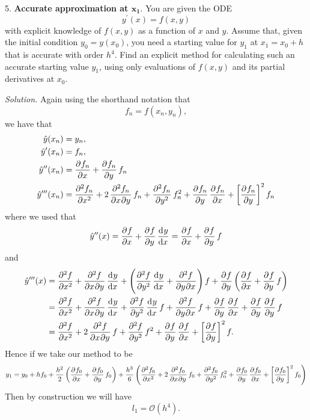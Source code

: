 \documentclass{article}
\newcommand{\Oh}{\mathcal{O}}
\begin{document}
\newpage

5. \textbf{Accurate approximation at $\boldsymbol{x_1}$}.
You are given the ODE
%
\begin{equation*}
    y^\prime(x) = f(x, y)
\end{equation*}
%
with explicit knowledge of $f(x, y)$ as a function of $x$ and $y$. Assume that, given the initial condition $y_0 = y(x_0)$,
you need a starting value for $y_1$ at $x_1 = x_0 + h$ that is accurate with order $h^4$. Find an explicit method for calculating
such an accurate starting value $y_1$, using only evaluations of $f(x, y)$ and its partial derivatives at $x_0$.

\textit{Solution.}
Again using the shorthand notation that
%
\begin{equation*}
    f_n = f(x_n, y_n),
\end{equation*}
%
we have that
%
\begin{align*}
    \hat{y}(x_n) &= y_n,
    \\
    \hat{y}^\prime(x_n) &= f_n,
    \\
    \hat{y}^{\prime \prime}(x_n)
        &= \dpd{f_n}{x}
        + \dpd{f_n}{y} f_n
    \\
    \hat{y}^{\prime \prime \prime}(x_n)
        &= \dpd[2]{f_n}{x}
        + 2 \dmd{f_n}{2}{x}{}{y}{} f_n
        + \dpd[2]{f_n}{y} f_n^2
        + \dpd{f_n}{y} \dpd{f_n}{x}
        + \sbr{\dpd{f_n}{y}}^2 f_n
\end{align*}
%
where we used that
%
\begin{equation*}
    \hat{y}^{\prime \prime}(x)
        = \dpd{f}{x} + \dpd{f}{y} \dod{y}{x}
        = \dpd{f}{x} + \dpd{f}{y} f
\end{equation*}
%
and
%
\begin{align*}
    \hat{y}^{\prime \prime \prime}(x)
    &= \dpd[2]{f}{x}
    + \dmd{f}{2}{x}{}{y}{} \dod{y}{x}
    + \del{
        \dpd[2]{f}{y} \dod{y}{x}
        + \dmd{f}{2}{y}{}{x}{}
    } f
    + \dpd{f}{y} \del{\dpd{f}{x} + \dpd{f}{y} f}
    \\
    &= \dpd[2]{f}{x}
    + \dmd{f}{2}{x}{}{y}{} \dod{y}{x}
    + \dpd[2]{f}{y} \dod{y}{x} f
    + \dmd{f}{2}{y}{}{x}{} f
    + \dpd{f}{y} \dpd{f}{x}
    + \dpd{f}{y} \dpd{f}{y} f
    \\
    &= \dpd[2]{f}{x}
    + 2 \dmd{f}{2}{x}{}{y}{} f
    + \dpd[2]{f}{y} f^2
    + \dpd{f}{y} \dpd{f}{x}
    + \sbr{\dpd{f}{y}}^2 f
    .
\end{align*}
%
Hence if we take our method to be
%
\begin{equation*}
    y_1 =
        y_0
        + h f_0
        + \frac{h^2}{2}
        \del{
            \dpd{f_0}{x}
            + \dpd{f_0}{y} f_0
        }
        + \frac{h^3}{6}
        \del{
            \dpd[2]{f_0}{x}
            + 2 \dmd{f_0}{2}{x}{}{y}{} f_0
            + \dpd[2]{f_0}{y} f_0^2
            + \dpd{f_0}{y} \dpd{f_0}{x}
            + \sbr{\dpd{f_0}{y}}^2 f_0
        }
\end{equation*}
%
Then by construction we will have
%
\begin{equation*}
    l_1 = \Oh(h^4)
    .
\end{equation*}
\end{document}
